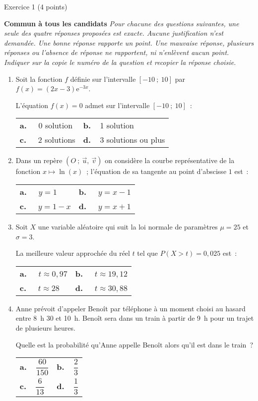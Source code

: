 
\begin{h2}Exercice 1 (4 points)\end{h2}
\textbf{Commun à  tous les candidats}
\medbreak
\emph{Pour chacune des questions suivantes, une seule des quatre réponses proposées est exacte. Aucune justification n'est demandée. Une bonne réponse rapporte un point. Une mauvaise réponse, plusieurs réponses ou l'absence de réponse ne rapportent, ni n'enlèvent aucun point.}
\medbreak
\emph{Indiquer sur la copie le numéro de la question et recopier la réponse choisie.}
\medbreak
\begin{enumerate}
     \item Soit la fonction $f$ définie sur l'intervalle $[-10~;~10]$ par $f(x) = (2x - 3)\text{e}^{-3x}$.
     \par
     L'équation $f(x) = 0$ admet sur l'intervalle $[-10~;~10]$~:
     \begin{tabularx}{\linewidth}{XX} %
          \textbf{a.~~} 0 solution&\textbf{b.~~}1 solution\\
          \textbf{c.~~} 2 solutions&\textbf{d.~~}3 solutions ou plus\\
     \end{tabularx}
     \item  Dans un repère $(O~;~\overrightarrow{u},~\overrightarrow{v})$ on considère la courbe représentative de la fonction $x \longmapsto \ln (x)$~; l'équation de sa tangente au point d'abscisse $1$ est~:
     \begin{tabularx}{\linewidth}{XX} %
          \textbf{a.~~} $y= 1$ &\textbf{b.~~} $y = x-1$ \\
          \textbf{c.~~} $y = 1- x$ &\textbf{d.~~} $y = x+ 1$\\
     \end{tabularx}
     \item  Soit $X$ une variable aléatoire qui suit la loi normale de paramètres $\mu = 25$ et $\sigma = 3$.
     \par
     La meilleure valeur approchée du réel $t$ tel que $P(X > t) = 0,025$ est~:
     \begin{tabularx}{\linewidth}{XX} %
          \textbf{a.~~} $t \approx 0,97$ &\textbf{b.~~} $t \approx 19,12$ \\
           \textbf{c.~~} $t \approx 28$ &\textbf{d.~~} $t \approx 30,88$\\
     \end{tabularx}
     \item  Anne prévoit d'appeler Benoît par téléphone à un moment choisi au hasard entre
     8~h 30 et 10~h. Benoît sera dans un train à partir de 9~h pour un trajet de plusieurs
     heures.
     \par
     Quelle est la probabilité qu'Anne appelle Benoît alors qu'il est dans le train~?
     \begin{tabularx}{\linewidth}{XX} %
          \textbf{a.~~}$\dfrac{60}{150}$&\textbf{b.~~}$\dfrac{2}{3}$\\
          \textbf{c.~~}$\dfrac{6}{13}$&\textbf{d.~~}$\dfrac{1}{3}$\\
     \end{tabularx}
 \end{enumerate}
